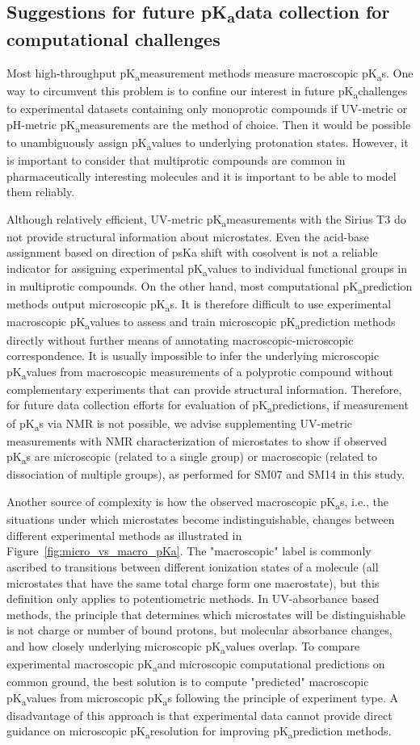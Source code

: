 \documentclass[9pt,lineno]{elife}
\newcommand{\pKa}{pK\textsubscript{a}}
\begin{document}
\subsection{Suggestions for future \pKa data collection for computational challenges}

Most high-throughput \pKa measurement methods measure macroscopic \pKa s. 
One way to circumvent this problem is to confine our interest in future \pKa challenges to experimental datasets containing only monoprotic compounds if UV-metric or pH-metric \pKa measurements are the method of choice. 
Then it would be possible to unambiguously assign \pKa values to underlying protonation states. 
However, it is important to consider that multiprotic compounds are common in pharmaceutically interesting molecules and it is important to be able to model them reliably.

Although relatively efficient, UV-metric \pKa measurements with the Sirius T3 do not provide structural information about microstates. 
Even the acid-base assignment based on direction of psKa shift with cosolvent is not a reliable indicator for assigning experimental \pKa values to individual functional groups in in multiprotic compounds. 
On the other hand, most computational \pKa prediction methods output microscopic \pKa s. 
It is therefore difficult to use experimental macroscopic \pKa values to assess and train microscopic \pKa prediction methods directly without further means of annotating macroscopic-microscopic correspondence. 
It is usually impossible to infer the underlying microscopic \pKa values from macroscopic measurements of a polyprotic compound without complementary experiments that can provide structural information. Therefore, for future data collection efforts for evaluation of \pKa predictions, if measurement of \pKa s via NMR is not possible, we advise supplementing UV-metric measurements with NMR characterization of microstates to show if observed \pKa s are microscopic (related to a single group) or macroscopic (related to dissociation of multiple groups), as performed for SM07 and SM14 in this study.

Another source of complexity is how the observed macroscopic \pKa s, i.e., the situations under which microstates become indistinguishable, changes between different experimental methods as illustrated in Figure~\ref{fig:micro_vs_macro_pKa}. 
The "macroscopic" label is commonly ascribed to transitions between different ionization states of a molecule (all microstates that have the same total charge form one macrostate), but this definition only applies to potentiometric methods. 
In UV-absorbance based methods, the principle that determines which microstates will be distinguishable is not charge or number of bound protons, but molecular absorbance changes, and how closely underlying microscopic \pKa values overlap. 
To compare experimental macroscopic \pKa and microscopic computational predictions on common ground, the best solution is to compute "predicted" macroscopic \pKa values from microscopic \pKa s following the principle of experiment type. 
A disadvantage of this approach is that experimental data cannot provide direct guidance on microscopic \pKa resolution for improving \pKa prediction methods.
\end{document}
